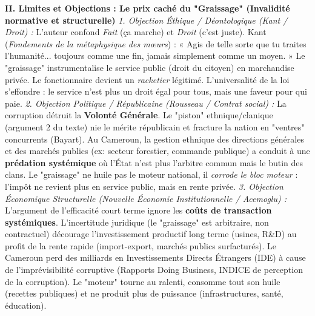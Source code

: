 \documentclass[11pt]{article}
\begin{document}
\begin{exoresolu}
\textbf{II. Limites et Objections : Le prix caché du "Graissage" (Invalidité normative et structurelle)}
\textit{1. Objection Éthique / Déontologique (Kant / Droit) :} L'auteur confond \emph{Fait} (ça marche) et \emph{Droit} (c'est juste). Kant (\emph{Fondements de la métaphysique des mœurs}) : « Agis de telle sorte que tu traites l'humanité... toujours comme une fin, jamais simplement comme un moyen. » Le "graissage" instrumentalise le service public (droit du citoyen) en marchandise privée. Le fonctionnaire devient un \emph{racketier} légitimé. L'universalité de la loi s'effondre : le service n'est plus un droit égal pour tous, mais une faveur pour qui paie.
\textit{2. Objection Politique / Républicaine (Rousseau / Contrat social) :} La corruption détruit la \textbf{Volonté Générale}. Le "piston" ethnique/clanique (argument 2 du texte) nie le mérite républicain et fracture la nation en "ventres" concurrents (Bayart). Au Cameroun, la gestion ethnique des directions générales et des marchés publics (ex: secteur forestier, commande publique) a conduit à une \textbf{prédation systémique} où l'État n'est plus l'arbitre commun mais le butin des clans. Le "graissage" ne huile pas le moteur national, il \emph{corrode le bloc moteur} : l'impôt ne revient plus en service public, mais en rente privée.
\textit{3. Objection Économique Structurelle (Nouvelle Économie Institutionnelle / Acemoglu) :} L'argument de l'efficacité court terme ignore les \textbf{coûts de transaction systémiques}. L'incertitude juridique (le "graissage" est arbitraire, non contractuel) décourage l'investissement productif long terme (usines, R\&D) au profit de la rente rapide (import-export, marchés publics surfacturés). Le Cameroun perd des milliards en Investissements Directs Étrangers (IDE) à cause de l'imprévisibilité corruptive (Rapports Doing Business, INDICE de perception de la corruption). Le "moteur" tourne au ralenti, consomme tout son huile (recettes publiques) et ne produit plus de puissance (infrastructures, santé, éducation).


\end{exoresolu}
\end{document}
